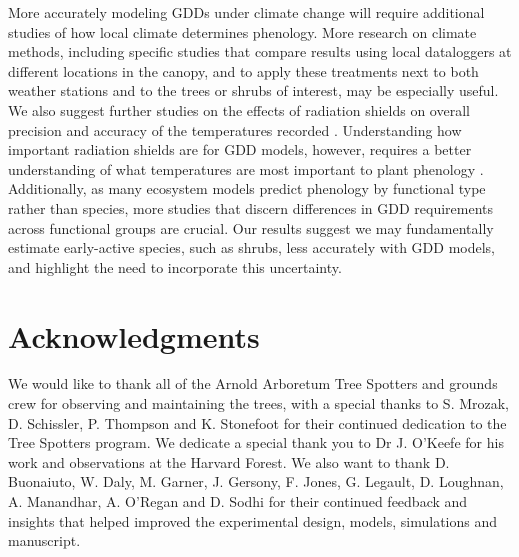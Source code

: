 \documentclass{article}\usepackage[]{graphicx}\usepackage[]{color}
\begin{document}
More accurately modeling GDDs under climate change will require additional studies of how local climate determines phenology. More research on climate methods, including specific studies that compare results using local dataloggers at different locations in the canopy, and to apply these treatments next to both weather stations and to the trees or shrubs of interest, may be especially useful. We also suggest further studies on the effects of radiation shields on overall precision and accuracy of the temperatures recorded \citep{daCunha2015}. Understanding how important radiation shields are for GDD models, however, requires a better understanding of what temperatures are most important to plant phenology \citep[e.g., bud temperature, including influences of bud color and structure and their interaction with solar radiation, versus air temperature,][]{Vitasse2021}. Additionally, as many ecosystem models predict phenology by functional type rather than species, more studies that discern differences in GDD requirements across functional groups are crucial. Our results suggest we may fundamentally estimate early-active species, such as shrubs, less accurately with GDD models, and highlight the need to incorporate this uncertainty. 


\section*{Acknowledgments}
We would like to thank all of the Arnold Arboretum Tree Spotters and grounds crew for observing and maintaining the trees, with a special thanks to S. Mrozak, D. Schissler, P. Thompson and K. Stonefoot for their continued dedication to the Tree Spotters program. We dedicate a special thank you to Dr J. O'Keefe for his work and observations at the Harvard Forest. We also want to thank D. Buonaiuto, W. Daly, M. Garner, J. Gersony, F. Jones, G. Legault, D. Loughnan, A. Manandhar, A. O'Regan and D. Sodhi for their continued feedback and insights that helped improved the experimental design, models, simulations and manuscript. 
\end{document}
